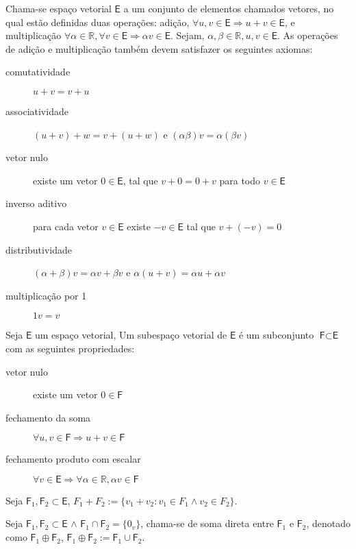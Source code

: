 \documentclass[10pt,a4paper]{article}
\begin{document}
\begin{definition}
	Chama-se espaço vetorial $\textsf{E}$ a um conjunto de elementos chamados vetores, no qual estão
	definidas duas operações: adição, $\forall u, v \in \textsf{E} \Rightarrow u+v \in \textsf{E}$,  e multiplicação $\forall \alpha \in \mathbb{R},  \forall v \in \textsf{E} \Rightarrow \alpha v \in \textsf{E}$. Sejam, $\alpha, \beta \in \mathbb{R}, u, v \in \textsf{E}$. As operações de adição e multiplicação também devem satisfazer os seguintes axiomas:
	\begin{description}
		\item[comutatividade     ] $u+v = v+u$
		\item[associatividade    ] $(u+v)+w = v+(u+w)$ e $(\alpha \beta)v = \alpha (\beta v)$
		\item[vetor nulo         ] existe um vetor $0 \in \textsf{E}$, tal que $v + 0 = 0 + v$ para todo $v \in \textsf{E}$
		\item[inverso aditivo    ] para cada vetor $v \in \textsf{E}$ existe $-v \in \textsf{E}$ tal que $v + (-v) = 0$
		\item[distributividade   ] $(\alpha + \beta)v = \alpha v + \beta v$ e $\alpha(u + v) = \alpha u + \alpha v$
		\item[multiplicação por 1] $1 v = v$
	\end{description}
\end{definition}


\begin{definition}
	Seja $\textsf{E}$ um espaço vetorial, Um subespaço vetorial de $\textsf{E}$ é um subconjunto $\textsf{F} \subset \textsf{E}$ com as seguintes propriedades:
	\begin{description}
		\item[vetor nulo         ] existe um vetor $0 \in \textsf{F}$
		\item[fechamento da soma] $\forall u, v \in \textsf{F} \Rightarrow u+v \in \textsf{F}$
		\item[fechamento produto com escalar] $\forall v \in \textsf{E} \Rightarrow \forall \alpha \in \mathbb{R}, \alpha v \in \textsf{F}$
	\end{description}
\end{definition}

\begin{definition}
	Seja $\textsf{F}_1, \textsf{F}_2 \subset \textsf{E}$, $F_1 + F_2 := \{ v_1 + v_2 : v_1 \in F_1 \land v_2 \in F_2 \}$.
\end{definition}
\par
\begin{definition}
	Seja $\textsf{F}_1, \textsf{F}_2 \subset \textsf{E}$ $\land$ $\textsf{F}_1 \cap \textsf{F}_2 = \{0_v\}$, chama-se de soma direta entre $\textsf{F}_1$ e $\textsf{F}_2$, denotado como $\textsf{F}_1 \oplus \textsf{F}_2$, $\textsf{F}_1 \oplus \textsf{F}_2 := \textsf{F}_1 \cup \textsf{F}_2$.
\end{definition}
\end{document}
